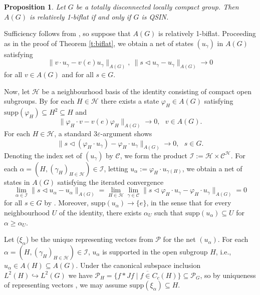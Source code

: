 \documentclass[preprint,12pt]{elsarticle}
\newtheorem{prop}[thm]{Proposition}
\newcommand{\mc}[1]{\mathcal{#1}}
\newcommand{\vphi}{\varphi}
\providecommand{\norm}[1]{\lVert#1\rVert}
\begin{document}
\begin{prop}\label{p:totallydisconn} Let $G$ be a totally disconnected locally compact group. Then $A(G)$ is relatively 1-biflat if and only if $G$ is QSIN.\end{prop}

\begin{pf} Sufficiency follows from \cite[Theorem 2.4]{ARS}, so suppose that $A(G)$ is relatively 1-biflat. Proceeding as in the proof of Theorem \ref{t:biflat}, we obtain a net of states $(u_\gamma)$ in $A(G)$ satisfying
$$\norm{v\cdot u_\gamma-v(e)u_\gamma}_{A(G)}, \ \norm{s\lhd u_\gamma-u_\gamma}_{A(G)}\rightarrow0$$
for all $v\in A(G)$ and for all $s\in G$.

Now, let $\mathcal{H}$ be a neighbourhood basis of the identity consisting of compact open subgroups. By \cite[Lemme 4.13]{E} for each $H\in\mc{H}$ there exists a state $\vphi_H\in A(G)$ satisfying $\mathrm{supp}(\vphi_H)\subseteq H^2\subseteq H$ and
$$\norm{\vphi_H\cdot v-v(e)\vphi_H}_{A(G)}\rightarrow 0, \ \ \ v\in A(G).$$
For each $H\in\mc{H}$, a standard $3\varepsilon$-argument shows
$$\norm{s\lhd(\vphi_H\cdot u_\gamma)-\vphi_H\cdot u_\gamma}_{A(G)}\rightarrow0, \ \ \ s\in G.$$
Denoting the index set of $(u_\gamma)$ by $\mc{C}$, we form the product $\mc{I}:=\mc{H}\times\mc{C}^{\mc{H}}$. For each $\alpha=(H,(\gamma_H)_{H\in\mc{H}})\in\mc{I}$, letting $u_\alpha:=\vphi_H\cdot u_{\gamma(H)}$, we obtain a net of states in $A(G)$ satisfying the iterated convergence
$$\lim_{\alpha\in\mc{I}}\norm{s\lhd u_\alpha- u_\alpha}_{A(G)}=\lim_{H\in\mc{H}}\lim_{\gamma\in\mc{C}}\norm{s\lhd\vphi_H\cdot u_{\gamma}-\vphi_H\cdot u_{\gamma}}_{A(G)}=0$$
for all $s\in G$ by \cite[pg. 69]{Kelley}. Moreover, $\mathrm{supp}(u_\alpha)\rightarrow\{e\}$, in the sense that for every neighbourhood $U$ of the identity, there exists $\alpha_U$ such that $\mathrm{supp}(u_\alpha)\subseteq U$ for $\alpha\geq\alpha_U$.

Let ($\xi_\alpha$) be the unique representing vectors from $\mc{P}$ for the net $(u_\alpha)$. For each $\alpha=(H,(\gamma_H)_{H\in\mc{H}})\in\mc{I}$, $u_\alpha$ is supported in the open subgroup $H$, i.e., $u_\alpha\in A(H)\subseteq A(G)$. Under the canonical subspace inclusion $L^2(H)\hookrightarrow L^2(G)$ we have $\mc{P}_H=\overline{\{f\ast Jf\mid f\in C_c(H)\}}\subseteq \mc{P}_G$, so by uniqueness of representing vectors \cite[Lemma 2.10]{H}, we may assume $\mathrm{supp}(\xi_\alpha)\subseteq H$.


\end{pf}
\end{document}
